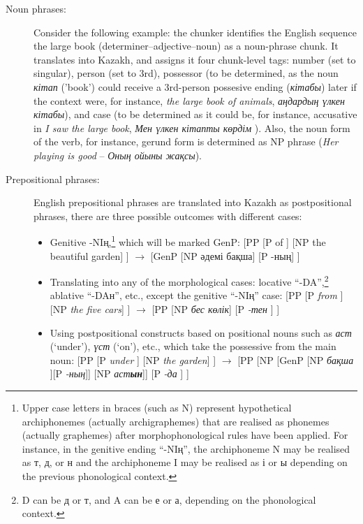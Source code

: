 \documentclass[11pt]{article}
\begin{document}
\begin{description}
\item[Noun phrases:] Consider the following example: the chunker identifies the English sequence 
  the large book  (determiner–adjective–noun) as a noun-phrase chunk. It translates into 
  Kazakh, and assigns it four chunk-level tags: number (set to singular), person (set to 3rd), 
  possessor (to be determined, as the noun \emph{кітап} ('book') could receive a 3rd-person possesive 
  ending (\emph{кітабы}) later if the context were, for instance, \emph{the large book of animals}, \emph{аңдардың үлкен кітабы}), 
  and case (to be determined as it could be, for instance, accusative in \emph{I saw the large book}, \emph{Мен үлкен кітапты көрдім} ). Also, the
  noun form of the verb, for instance,  gerund form is determined as NP phrase (\emph{Her playing is good} – \emph{Оның ойыны жақсы}).
\item[Prepositional phrases:] English prepositional phrases are translated into Kazakh as postpositional phrases, 
  there are three possible outcomes with different cases:
   \begin{itemize}
    \item Genitive -{N}{I}ң,\footnote{Upper case letters in braces (such as {N}) represent hypothetical archiphonemes (actually archigraphemes) that are realised as phonemes (actually graphemes) after morphophonological rules have been applied. For instance, in the genitive ending “-{N}{I}ң”, the archiphoneme {N} may be realised as т, д, or н and the archiphoneme {I} may be realised as  і  or ы depending on the previous phonological context. } which will be marked GenP:  
        [PP [P of ] [NP the beautiful garden] ] $\rightarrow$ [GenP [NP әдемі бақша] [P -ның] ] 
    \item Translating into any of the morphological cases: locative ``-{D}{A}'',\footnote{{D} can be д or т, and {A} can be е or а, depending on the 
        phonological context.} ablative ``-{D}{A}н'', etc., except the genitive ``-{N}{I}ң'' case: 
        [PP [P \emph{from} ] [NP \emph{the five cars}] ] $\rightarrow$ [PP [NP \emph{бес көлік}] [P \emph{-тен} ] ]
    \item Using postpositional constructs based on positional nouns such as \emph{аст} (`under'), \emph{үст} (`on'), etc., which take the possessive from the main noun:  
        [PP [P \emph{under} ] [NP \emph{the garden}] ] $\rightarrow$ [PP [NP [GenP [NP \emph{бақша} ][P \emph{-ның}]] [NP \emph{аст\textbf{ын}}]] [P \emph{-да} ] ]

\end{itemize}
\end{description}
\end{document}
